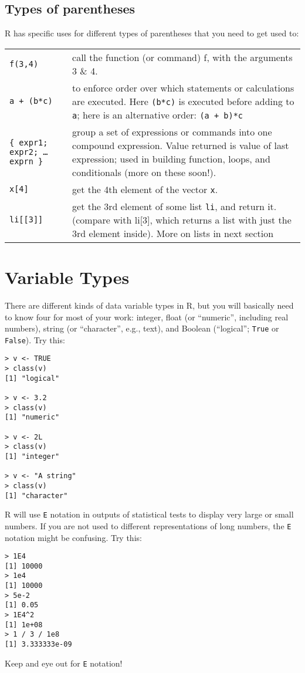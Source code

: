 \subsection{Types of parentheses}
R has specific uses for different types of parentheses that you need to 
get used to:

\begin{tabular}{p{5cm} p{9.5cm}} 
 {\tt f(3,4)} & call the function (or command) f, with the 
	arguments 3 \& 4. \\
 {\tt a + (b*c)} & to enforce order over which statements 
  or calculations are executed. Here {\tt (b*c)} is executed before 
  adding to {\tt a}; here is an alternative order: {\tt (a + b)*c}\\
 {\tt \{ expr1; expr2; \ldots exprn \}} & group a set of expressions or 
 commands into one compound expression. Value returned is value of last
    expression; used in building function, loops, and conditionals (more on 
    these soon!).\\
 {\tt x[4] } & get the 4th element of the vector {\tt x}.\\
 {\tt li[[3]]} & get the 3rd element of some list {\tt li}, and return it.
    (compare with li[3], which returns a list with just the 3rd element
    inside). More on lists in next section
\end{tabular}

\section{Variable Types}

There are different kinds of data variable types in R, but you will 
basically need to know four for most of your work: integer, float (or 
``numeric'', including real numbers), string (or ``character'', e.g., 
text), and Boolean (``logical''; {\tt True} or {\tt False}).  Try this:

\begin{lstlisting}
> v <- TRUE
> class(v)
[1] "logical"

> v <- 3.2
> class(v)
[1] "numeric"

> v <- 2L
> class(v)
[1] "integer"

> v <- "A string"
> class(v)
[1] "character"
\end{lstlisting}

\begin{tipbox}
R will use {\tt E} notation in outputs of statistical tests to display 
very large or small numbers. If you are not used to different 
representations of long numbers, the {\tt E} notation might be 
confusing. Try this:
\begin{lstlisting}
> 1E4
[1] 10000
> 1e4
[1] 10000
> 5e-2
[1] 0.05
> 1E4^2
[1] 1e+08
> 1 / 3 / 1e8
[1] 3.333333e-09
\end{lstlisting}
Keep and eye out for {\tt E} notation! 
\end{tipbox}

